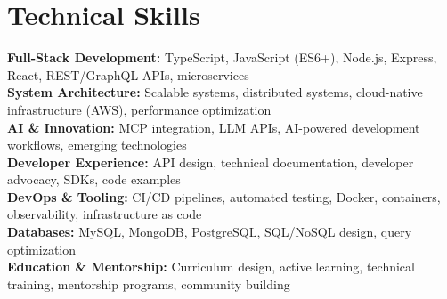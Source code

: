 \documentclass[11pt]{article}
\begin{document}
\section*{Technical Skills}
\textbf{Full-Stack Development:} TypeScript, JavaScript (ES6+), Node.js, Express, React, REST/GraphQL APIs, microservices \\
\textbf{System Architecture:} Scalable systems, distributed systems, cloud-native infrastructure (AWS), performance optimization \\
\textbf{AI \& Innovation:} MCP integration, LLM APIs, AI-powered development workflows, emerging technologies \\
\textbf{Developer Experience:} API design, technical documentation, developer advocacy, SDKs, code examples \\
\textbf{DevOps \& Tooling:} CI/CD pipelines, automated testing, Docker, containers, observability, infrastructure as code \\
\textbf{Databases:} MySQL, MongoDB, PostgreSQL, SQL/NoSQL design, query optimization \\
\textbf{Education \& Mentorship:} Curriculum design, active learning, technical training, mentorship programs, community building
\end{document}
